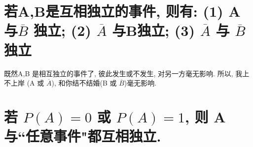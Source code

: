 \documentclass[UTF8]{ctexart}
\begin{document}
		
		
		
		
		\section{若A,B是互相独立的事件, 则有: (1) A与$ \overline{B}$ 独立; (2) $ \overline{A}$ 与B独立; (3) $ \overline{A}$ 与 $ \overline{B}$ 独立}
		
		既然A,B 是相互独立的事件了, 彼此发生或不发生, 对另一方毫无影响. 所以, 我上不上岸 (A 或 $\overline{A}$), 和你结不结婚(B 或 $\overline{B}$)毫无影响. 
		
		
		
		\section{若 $P(A)=0$ 或 $P(A)=1$, 则 A与``任意事件"都互相独立.}	
		
		
	
	
	
	
	
	
\end{document}

